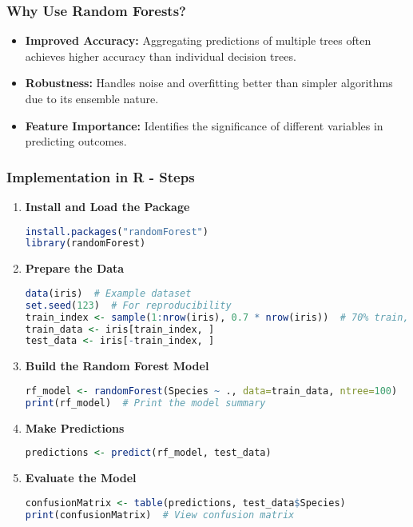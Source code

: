 \documentclass[aspectratio=169]{beamer}
\begin{document}
\begin{frame}[fragile]
    \frametitle{Why Use Random Forests?}
    \begin{itemize}
        \item \textbf{Improved Accuracy:} Aggregating predictions of multiple trees often achieves higher accuracy than individual decision trees.
        \item \textbf{Robustness:} Handles noise and overfitting better than simpler algorithms due to its ensemble nature.
        \item \textbf{Feature Importance:} Identifies the significance of different variables in predicting outcomes.
    \end{itemize}
\end{frame}

\begin{frame}[fragile]
    \frametitle{Implementation in R - Steps}
    \begin{enumerate}
        \item \textbf{Install and Load the Package}
        \begin{lstlisting}[language=R]
install.packages("randomForest")
library(randomForest)
        \end{lstlisting}

        \item \textbf{Prepare the Data}
        \begin{lstlisting}[language=R]
data(iris)  # Example dataset
set.seed(123)  # For reproducibility
train_index <- sample(1:nrow(iris), 0.7 * nrow(iris))  # 70% train, 30% test
train_data <- iris[train_index, ]
test_data <- iris[-train_index, ]
        \end{lstlisting}

        \item \textbf{Build the Random Forest Model}
        \begin{lstlisting}[language=R]
rf_model <- randomForest(Species ~ ., data=train_data, ntree=100)
print(rf_model)  # Print the model summary
        \end{lstlisting}

        \item \textbf{Make Predictions}
        \begin{lstlisting}[language=R]
predictions <- predict(rf_model, test_data)
        \end{lstlisting}

        \item \textbf{Evaluate the Model}
        \begin{lstlisting}[language=R]
confusionMatrix <- table(predictions, test_data$Species)
print(confusionMatrix)  # View confusion matrix
        \end{lstlisting}
    \end{enumerate}
\end{frame}
\end{document}
